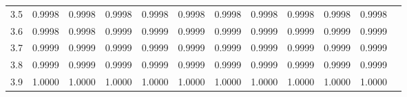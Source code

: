 \documentclass[12pt,twoside,a4paper]{article}
\begin{document}
\begin{center}
\begin{tabular}{rr@{\ }r@{\ }r@{\ }r@{\ }r@{\ }r@{\ }r@{\ }r@{\ }r@{\ }r@{\ }r}
3.5&0.9998&0.9998&0.9998&0.9998&0.9998&0.9998&0.9998&0.9998&0.9998&0.9998\\
3.6&0.9998&0.9998&0.9999&0.9999&0.9999&0.9999&0.9999&0.9999&0.9999&0.9999\\
3.7&0.9999&0.9999&0.9999&0.9999&0.9999&0.9999&0.9999&0.9999&0.9999&0.9999\\
3.8&0.9999&0.9999&0.9999&0.9999&0.9999&0.9999&0.9999&0.9999&0.9999&0.9999\\
3.9&1.0000&1.0000&1.0000&1.0000&1.0000&1.0000&1.0000&1.0000&1.0000&1.0000\\
\end{tabular}
\end{center}
\end{document}
